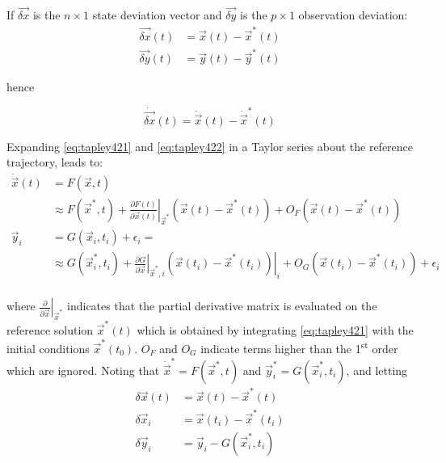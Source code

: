 If \(\vec{\delta x}\) is the \( n \times 1 \) state deviation vector and 
\(\vec{\delta y}\) is the \(p \times 1\) observation deviation:
\begin{equation}
  \begin{aligned}
    \vec{\delta x} (t) &= \vec{x}(t) - \vec{x}^* (t) \\
    \vec{\delta y} (t) &= \vec{y}(t) - \vec{y}^*(t)
  \end{aligned}
\end{equation}

hence

\begin{equation}
  \dot{\vec{\delta x}} (t) = \dot{\vec{x}} (t) - \dot{\vec{x}}^* (t)
\end{equation}

Expanding \ref{eq:tapley421} and \ref{eq:tapley422} in a Taylor series about the 
reference trajectory, leads to:
\begin{equation}
\label{eq:tapley425}
\begin{aligned}
  \dot{\vec{x}} (t) &= F (\vec{x}, t) \\
   & \approx F (\vec{x}^* , t) 
    + \left.\frac{\partial F(t)}{\partial \vec{x}(t)}\right|_{\vec{x}^*} \left( \vec{x}(t) - \vec{x}^* (t) \right)
    + O_F \left( \vec{x}(t) - \vec{x}^* (t) \right) \\
    \vec{y}_i &= G( \vec{x}_i , t_i ) + {\epsilon}_i = \\ & \approx G( \vec{x}^*_i , t_i )
    + \left.\frac{\partial G}{\partial \vec{x}}\right|_{\vec{x}^* , i} \left.\left( \vec{x}(t_i) - \vec{x}^* (t_i) \right)\right|_{i} 
    + O_G \left( \vec{x}(t_i) - \vec{x}^* (t_i) \right) + {\epsilon}_i \\
\end{aligned}
\end{equation}

where \(\left.\frac{\partial}{\partial \vec{x}}\right|_{\vec{x}^*}\) indicates that 
the partial derivative matrix is evaluated on the reference solution \(\vec{x}^* (t)\) 
which is obtained by integrating \ref{eq:tapley421} with the initial conditions 
\(\vec{x}^* (t_0)\). \(O_F\) and \(O_G\) indicate terms higher than the 1\textsuperscript{st} 
order which are ignored. Noting that \(\dot{\vec{x}}^* = F(\vec{x}^* ,t)\) and 
\(\vec{y}^*_i = G(\vec{x}^*_i , t_i )\), and letting
\begin{equation}
\begin{aligned}
\delta \vec{x}(t) & = \vec{x}(t) - \vec{x}^*(t)\\
\delta \vec{x}_i  & = \vec{x}(t_i) - \vec{x}^*(t_i)\\
\delta \vec{y}_i  & = \vec{y}_i - G(\vec{x}^*_i , t_i )
\end{aligned}
\end{equation}

